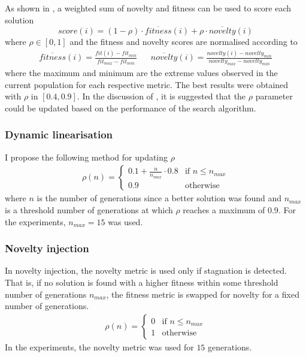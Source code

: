 As shown in \cite{novelty_not_enough}, a weighted sum of novelty and fitness can be used to score each solution
\[
    score(i) = (1-\rho) \cdot \overline{fitness}(i) + \rho \cdot \overline{novelty}(i)
\]
where $\rho \in [0,1]$ and the fitness and novelty scores are normalised according to
\begin{align*}
    \overline{fitness}(i) =  \frac{fit(i) - fit_{min}}{fit_{max} - fit_{min}} && \overline{novelty}(i) =  \frac{novelty(i) - novelty_{min}}{novelty_{max} - novelty_{min}}
\end{align*}
where the maximum and minimum are the extreme values observed in the current population for each respective metric.
The best results were obtained with $\rho$ in $[0.4,0.9]$. In the discussion of \cite{novelty_not_enough}, it is suggested
that the $\rho$ parameter could be updated based on the performance of the search algorithm.

\subsubsection{Dynamic linearisation}
\label{subsubsection:dynamic_linearisation}
I propose the following method for updating $\rho$
\begin{align*}
    \rho(n) =
        \begin{cases}
            0.1 + \frac{n}{n_{max}} \cdot 0.8 & \text{if $n \leq n_{max}$}\\
            0.9 & \text{otherwise}
        \end{cases}
\end{align*}
where $n$ is the number of generations since a better solution was found and
$n_{max}$ is a threshold number of generations at which $\rho$ reaches a maximum
of $0.9$. For the experiments, $n_{max}=15$ was used.

\subsubsection{Novelty injection}
\label{subsection:injection}
In novelty injection, the novelty metric is used only if stagnation is detected. That is, if no solution is found with a
higher fitness within some threshold number of generations $n_{max}$, the fitness metric is swapped for novelty for a fixed
number of generations.
\begin{align*}
    \rho(n) =
        \begin{cases}
            0 & \text{if $n \leq n_{max}$}\\
            1 & \text{otherwise}
        \end{cases}
\end{align*}
In the experiments, the novelty metric was used for $15$ generations.

